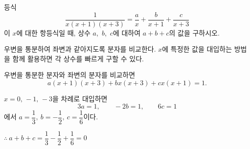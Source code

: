 \documentclass[10pt]{article}
\begin{document}
\newpage


\begin{dmproblem}
등식
\begin{equation*}
  \dfrac{1}{x(x + 1)(x + 3)} = \dfrac{a}{x} + \dfrac{b}{x + 1} + \dfrac{c}{x + 3}
\end{equation*}
이 $x$에 대한 항등식일 때, 상수 $a$,\ $b$,\ $c$에 대하여 $a + b + c$의 값을 구하시오.
\end{dmproblem}

\begin{dmapproach}
우변을 통분하여 좌변과 같아지도록 분자를 비교한다. $x$에 특정한 값을 대입하는 방법을 함께 활용하면 각 상수를 빠르게 구할 수 있다.
\end{dmapproach}

\begin{dmsolution}
우변을 통분한 분자와 좌변의 분자를 비교하면
\begin{equation*}
  a(x + 1)(x + 3) + bx(x + 3) + cx(x + 1) = 1.
\end{equation*}

$x = 0,\, -1,\, -3$을 차례로 대입하면
\begin{equation*}
  3a = 1,\qquad -2b = 1,\qquad 6c = 1
\end{equation*}
에서 $a = \dfrac{1}{3},\ b = -\dfrac{1}{2},\ c = \dfrac{1}{6}$이다.

$\therefore\ a + b + c = \dfrac{1}{3} - \dfrac{1}{2} + \dfrac{1}{6} = 0$
\end{dmsolution}

\dmchecktitle



\newpage

\end{document}
